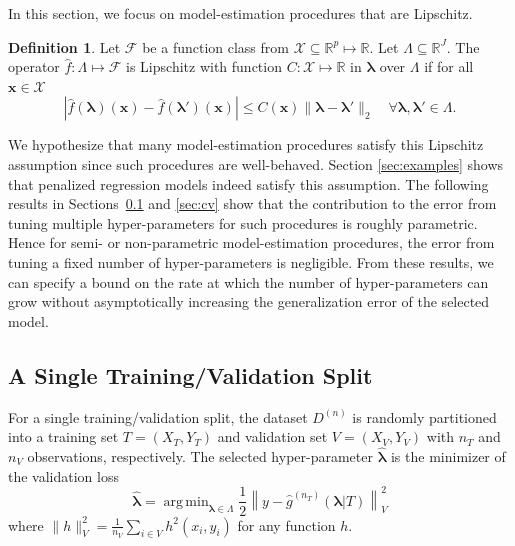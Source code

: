 \documentclass[12pt]{article} %
\theoremstyle{definition}
\newtheorem{definition}{Definition}
\DeclareMathOperator*{\argmin}{arg\,min}
\begin{document}
In this section, we focus on model-estimation procedures that are Lipschitz.
\begin{definition}
	\label{def:smooth_funcs}
	Let $\mathcal{F}$ be a function class from $\mathcal{X} \subseteq \mathbb{R}^p \mapsto \mathbb{R}$. Let $\Lambda \subseteq \mathbb{R}^J$.
	The operator $\hat{f}: \Lambda \mapsto \mathcal{F}$ is Lipschitz with function $C:\mathcal{X} \mapsto \mathbb{R}$ in $\boldsymbol{\lambda}$ over $\Lambda$ if for all $\boldsymbol{x} \in \mathcal{X}$
	\begin{equation}
	\left | \hat{f}(\boldsymbol \lambda)(\boldsymbol{x}) - \hat{f}(\boldsymbol \lambda ')(\boldsymbol{x}) \right |
	\le
	C(\boldsymbol{x}) \| \boldsymbol \lambda - \boldsymbol \lambda' \|_2 
	\quad
	\forall \boldsymbol \lambda,\boldsymbol \lambda' \in \Lambda.
	\label{eq:smooth_funcs}
	\end{equation}
\end{definition}
We hypothesize that many model-estimation procedures satisfy this Lipschitz assumption since such procedures are well-behaved.
Section \ref{sec:examples} shows that penalized regression models indeed satisfy this assumption. The following results in Sections~\ref{sec:single} and \ref{sec:cv} show that the contribution to the error from tuning multiple hyper-parameters for such procedures is roughly parametric. Hence for semi- or non-parametric model-estimation procedures, the error from tuning a fixed number of hyper-parameters is negligible. From these results, we can specify a bound on the rate at which the number of hyper-parameters can grow without asymptotically increasing the generalization error of the selected model.

\subsection{A Single Training/Validation Split}\label{sec:single}

For a single training/validation split, the dataset $D^{(n)}$ is randomly partitioned into a training set $T = (X_T, Y_T)$ and validation set $V = (X_V, Y_V)$ with $n_T$ and $n_V$ observations, respectively. The selected hyper-parameter $\hat{\boldsymbol{\lambda}}$ is the minimizer of the validation loss
\begin{equation}
\label{eq:train_val_lambda}
\hat{\boldsymbol \lambda} = \argmin_{\boldsymbol{\lambda} \in\Lambda} \frac{1}{2} \left \| y-\hat{g}^{(n_T)}( \boldsymbol \lambda | T) \right \|_{V}^{2}
\end{equation}
where $\| h \|^2_{V}=\frac{1}{n_V}\sum_{i\in V} h^2(x_i, y_i)$ for any function $h$. 
\end{document}
